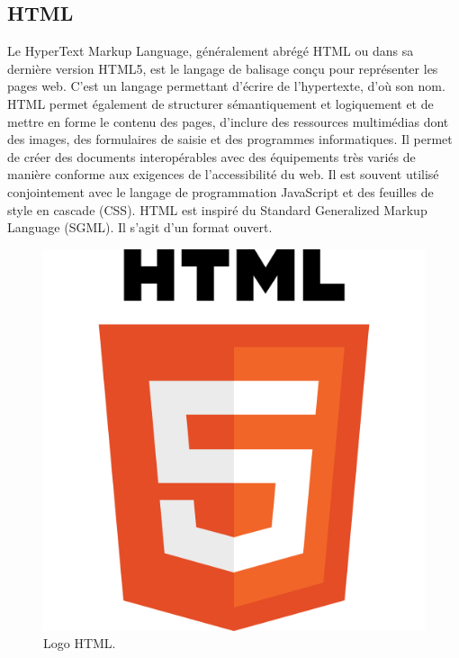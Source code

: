 \documentclass[12pt,a4paper]{report}
\begin{document}
\subsection{HTML}
Le HyperText Markup Language, généralement abrégé HTML ou dans sa dernière version HTML5, est le langage de balisage conçu pour représenter les pages web. C’est un langage permettant d’écrire de l’hypertexte, d’où son nom. HTML permet également de structurer sémantiquement et logiquement et de mettre en forme le contenu des pages, d’inclure des ressources multimédias dont des images, des formulaires de saisie et des programmes informatiques. Il permet de créer des documents interopérables avec des équipements très variés de manière conforme aux exigences de l’accessibilité du web. Il est souvent utilisé conjointement avec le langage de programmation JavaScript et des feuilles de style en cascade (CSS). HTML est inspiré du Standard Generalized Markup Language (SGML). Il s'agit d'un format ouvert.
\begin{figure}[H]
	\centering
	\includegraphics[width=0.3\linewidth]{html}
	\caption{Logo HTML.}
	
\end{figure}
\end{document}
